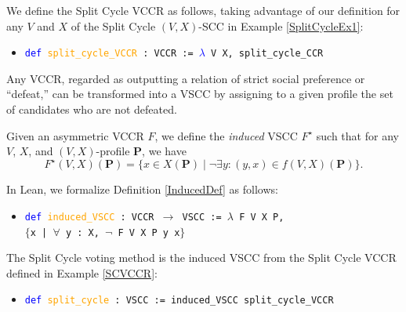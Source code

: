 \documentclass[runningheads]{llncs}
\begin{document}
\begin{example}\label{SCVCCR} We define the Split Cycle VCCR as follows, taking advantage of our definition for any $V$ and $X$ of the Split Cycle $(V,X)$-SCC in Example \ref{SplitCycleEx1}:
\begin{itemize}
\item[] \texttt{\textcolor{blue}{def} \textcolor{orange}{split\_cycle\_VCCR} : VCCR := \textcolor{blue}{$\lambda$} V X, split\_cycle\_CCR}
\end{itemize}
\end{example}

Any VCCR, regarded as outputting a relation of strict social preference or ``defeat,'' can be transformed into a VSCC by assigning to a given profile the set of candidates who are not defeated. 

\begin{definition}\label{InducedDef} \textnormal{Given an asymmetric VCCR $F$, we define the \textit{induced} VSCC $F^\star$ such that for any $V$, $X$, and $(V,X)$-profile $\mathbf{P}$, we have \[F^\star(V,X)(\mathbf{P})=\{x\in X(\mathbf{P})\mid \neg\exists y: (y,x)\in f(V,X)(\mathbf{P})\}.\]}
\end{definition}
In Lean, we formalize Definition \ref{InducedDef} as follows:
\begin{itemize}
\item[] \texttt{\textcolor{blue}{def} \textcolor{orange}{induced\_VSCC} : VCCR $\to$ VSCC := $\lambda$ F V X P,} \\
\texttt{$\{$x | $\forall$ y : X, $\neg$ F V X P y x$\}$}
\end{itemize}

\begin{example} The Split Cycle voting method \cite{HP2020b} is the induced VSCC from the Split Cycle VCCR defined in Example \ref{SCVCCR}: 
\begin{itemize}
\item[] \texttt{\textcolor{blue}{def} \textcolor{orange}{split\_cycle} : VSCC := induced\_VSCC split\_cycle\_VCCR}
\end{itemize}
\end{example}
\end{document}
